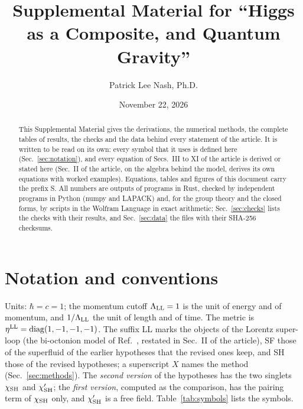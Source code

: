\documentclass[aps,prd,onecolumn,superscriptaddress,nofootinbib,floatfix,longbibliography]{revtex4-2}
\newcommand{\LL}{{\rm LL}}
\newcommand{\SH}{{\rm SH}}
\begin{document}
\title{Supplemental Material for ``Higgs as a Composite, and Quantum Gravity''}

\author{Patrick Lee Nash, Ph.D.}

\date{November 22, 2026}

\begin{abstract}
This Supplemental Material gives the derivations, the numerical methods, the complete tables of results, the checks and
the data behind every statement of the article. It is written to be read on its own: every symbol that it uses is
defined here (Sec.~\ref{sec:notation}), and every equation of Secs.~III to XI of the article is derived or stated here
(Sec.~II of the article, on the algebra behind the model, derives its own equations with worked examples). Equations, tables and
figures of this document carry the prefix S. All numbers are outputs of programs in Rust, checked by independent
programs in Python (numpy and LAPACK) and, for the group theory and the closed forms, by scripts in the Wolfram Language
in exact arithmetic; Sec.~\ref{sec:checks} lists the checks with their results, and Sec.~\ref{sec:data} the files with
their SHA-256 checksums.
\end{abstract}

\maketitle

\tableofcontents

\section{Notation and conventions}
\label{sec:notation}

Units: $\hbar=c=1$; the momentum cutoff $\Lambda_\LL=1$ is the unit of energy and of momentum, and $1/\Lambda_\LL$ the unit
of length and of time. The metric is $\eta^\LL={\rm diag}(1,-1,-1,-1)$. The suffix LL marks the objects of the Lorentz
super-loop (the bi-octonion model of Ref.~\cite{Nash2026}, restated in Sec.~II of the article), SF those of the superfluid of the earlier hypotheses that the
revised ones keep, and SH those of the revised hypotheses; a superscript $X$ names the method (Sec.~\ref{sec:methods}).
The \emph{second version} of the hypotheses has the two singlets $\chi_\SH$ and $\chi'_\SH$; the \emph{first version},
computed as the comparison, has the pairing term of $\chi_\SH$ only, and $\chi'_\SH$ is a free field. Table~\ref{tab:symbols}
lists the symbols.
\end{document}

